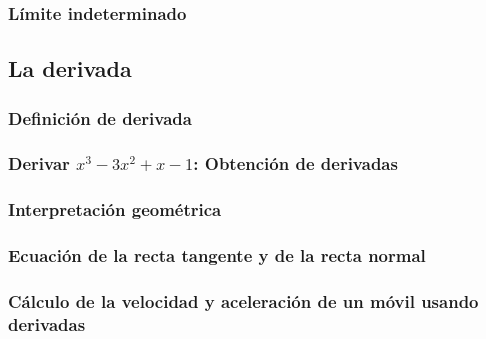 \subsubsection{Límite indeterminado}

\subsection{La derivada}
\subsubsection{Definición de derivada}
\subsubsection{Derivar $x^3 - 3x^2 + x - 1$: Obtención de derivadas}
\subsubsection{Interpretación geométrica}
\subsubsection{Ecuación de la recta tangente y de la recta normal}
\subsubsection{Cálculo de la velocidad y aceleración de un móvil usando derivadas}


